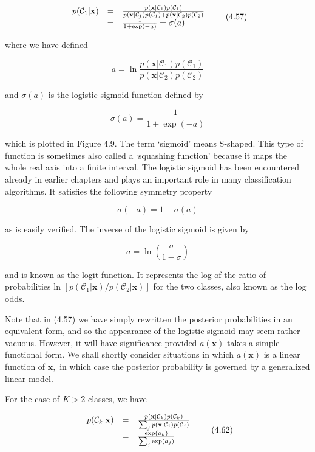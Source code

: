 \documentclass[
  10
]{article}
\begin{document}
\[
\begin{array}{r c l} p (\mathcal {C} _ {1} | \mathbf {x}) & = & \frac {p (\mathbf {x} | \mathcal {C} _ {1}) p (\mathcal {C} _ {1})}{p (\mathbf {x} | \mathcal {C} _ {1}) p (\mathcal {C} _ {1}) + p (\mathbf {x} | \mathcal {C} _ {2}) p (\mathcal {C} _ {2})} \\ & = & \frac {1}{1 + \exp (- a)} = \sigma (a) \end{array}\tag{4.57}
\]

where we have defined

\[
a = \ln {\frac {p (\mathbf {x} | \mathcal {C} _ {1}) p (\mathcal {C} _ {1})}{p (\mathbf {x} | \mathcal {C} _ {2}) p (\mathcal {C} _ {2})}}\tag{4.58}
\]

and \(\sigma ( a )\) is the logistic sigmoid function defined by

\[
\sigma (a) = \frac {1}{1 + \exp (- a)}\tag{4.59}
\]

which is plotted in Figure 4.9. The term `sigmoid' means S-shaped. This
type of function is sometimes also called a `squashing function' because
it maps the whole real axis into a finite interval. The logistic sigmoid
has been encountered already in earlier chapters and plays an important
role in many classification algorithms. It satisfies the following
symmetry property

\[
\sigma (- a) = 1 - \sigma (a)\tag{4.60}
\]

as is easily verified. The inverse of the logistic sigmoid is given by

\[
a = \ln \left(\frac {\sigma}{1 - \sigma}\right)\tag{4.61}
\]

and is known as the logit function. It represents the log of the ratio
of probabilities ln
\([ p ( \mathcal { C } _ { 1 } | \mathbf { x } ) / p ( \mathcal { C } _ { 2 } | \mathbf { x } ) ]\)
for the two classes, also known as the log odds.

Note that in (4.57) we have simply rewritten the posterior probabilities
in an equivalent form, and so the appearance of the logistic sigmoid may
seem rather vacuous. However, it will have significance provided
\(a ( \mathbf { x } )\) takes a simple functional form. We shall shortly
consider situations in which \(a ( \mathbf { x } )\) is a linear
function of \(\mathbf { x } ,\) in which case the posterior probability
is governed by a generalized linear model.

For the case of \(K > 2\) classes, we have

\[
\begin{array}{r c l} p (\mathcal {C} _ {k} | \mathbf {x}) & = & \frac {p (\mathbf {x} | \mathcal {C} _ {k}) p (\mathcal {C} _ {k})}{\sum_ {j} p (\mathbf {x} | \mathcal {C} _ {j}) p (\mathcal {C} _ {j})} \\ & = & \frac {\exp (a _ {k})}{\sum_ {j} \exp (a _ {j})} \end{array}\tag{4.62}
\]
\end{document}
